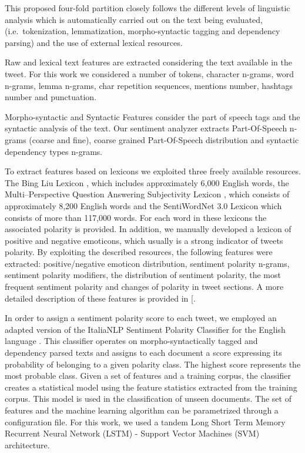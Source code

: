 \documentclass[]{book}
\theoremstyle{definition}
\theoremstyle{definition}
\theoremstyle{definition}
\theoremstyle{remark}
\begin{document}
This proposed four-fold partition closely follows the different levels
of linguistic analysis which is automatically carried out on the text
being evaluated, (i.e.~tokenization, lemmatization, morpho-syntactic
tagging and dependency parsing) and the use of external lexical
resources.

Raw and lexical text features are extracted considering the text
available in the tweet. For this work we considered a number of tokens,
character n-grams, word n-grams, lemma n-grams, char repetition
sequences, mentions number, hashtags number and punctuation.

Morpho-syntactic and Syntactic Features consider the part of speech tags
and the syntactic analysis of the text. Our sentiment analyzer extracts
Part-Of-Speech n-grams (coarse and fine), coarse grained Part-Of-Speech
distribution and syntactic dependency types n-grams.

To extract features based on lexicons we exploited three freely
available resources. The Bing Liu Lexicon \citep{hu2004mining}, which
includes approximately 6,000 English words, the Multi--Perspective
Question Answering Subjectivity Lexicon \citep{wilson2005recognizing},
which consists of approximately 8,200 English words and the SentiWordNet
3.0 Lexicon \citep{baccianella2010sentiwordnet} which consists of more
than 117,000 words. For each word in these lexicons the associated
polarity is provided. In addition, we manually developed a lexicon of
positive and negative emoticons, which usually is a strong indicator of
tweets polarity. By exploiting the described resources, the following
features were extracted: positive/negative emoticon distribution,
sentiment polarity n-grams, sentiment polarity modifiers, the
distribution of sentiment polarity, the most frequent sentiment polarity
and changes of polarity in tweet sections. A more detailed description
of these features is provided in {[}\citet{cimino2014linguistically}.

In order to assign a sentiment polarity score to each tweet, we employed
an adapted version of the ItaliaNLP Sentiment Polarity Classifier for
the English language \citep{cimino2014linguistically}. This classifier
operates on morpho-syntactically tagged and dependency parsed texts and
assigns to each document a score expressing its probability of belonging
to a given polarity class. The highest score represents the most
probable class. Given a set of features and a training corpus, the
classifier creates a statistical model using the feature statistics
extracted from the training corpus. This model is used in the
classification of unseen documents. The set of features and the machine
learning algorithm can be parametrized through a configuration file. For
this work, we used a tandem Long Short Term Memory Recurrent Neural
Network (LSTM) - Support Vector Machines (SVM) architecture.
\end{document}
